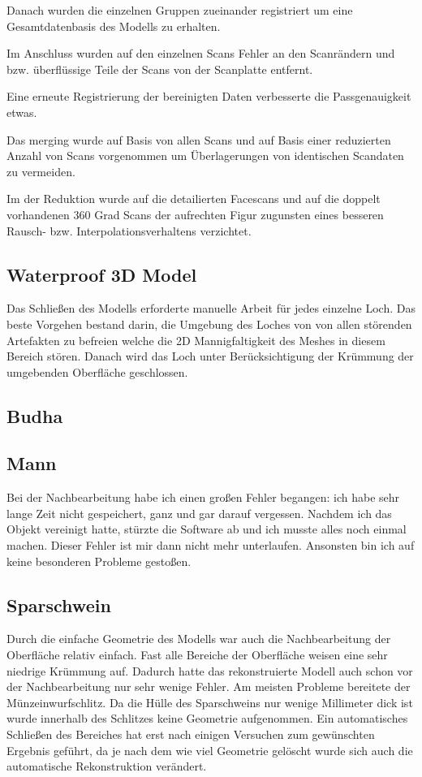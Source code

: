 \documentclass[]{article}
\begin{document}
Danach wurden die einzelnen Gruppen zueinander registriert um eine Gesamtdatenbasis des Modells zu erhalten.

Im Anschluss wurden auf den einzelnen Scans Fehler an den Scanrändern und bzw. überflüssige Teile der Scans von der Scanplatte entfernt.

Eine erneute Registrierung der bereinigten Daten verbesserte die Passgenauigkeit etwas. 

Das merging wurde auf Basis von allen Scans und auf Basis einer reduzierten Anzahl von Scans vorgenommen um Überlagerungen von identischen Scandaten zu vermeiden.

Im der Reduktion wurde auf die detailierten Facescans und auf die doppelt vorhandenen 360 Grad Scans der aufrechten Figur zugunsten eines besseren Rausch- bzw. Interpolationsverhaltens verzichtet.

\subsection{Waterproof 3D Model}

Das Schließen des Modells erforderte manuelle Arbeit für jedes einzelne Loch. Das beste Vorgehen bestand darin, die Umgebung des Loches von von allen störenden Artefakten zu befreien welche die 2D Mannigfaltigkeit des Meshes in diesem Bereich stören. Danach wird das Loch unter Berücksichtigung der Krümmung der umgebenden Oberfläche geschlossen.

\subsection{Budha}



\subsection{Mann}
Bei der Nachbearbeitung habe ich einen großen Fehler begangen: ich habe sehr lange Zeit nicht gespeichert, ganz und gar darauf vergessen. Nachdem ich das Objekt vereinigt hatte, stürzte die Software ab und ich musste alles noch einmal machen. Dieser Fehler ist mir dann nicht mehr unterlaufen. Ansonsten bin ich auf keine besonderen Probleme gestoßen.

\subsection{Sparschwein}
Durch die einfache Geometrie des Modells war auch die Nachbearbeitung der Oberfläche relativ einfach. Fast alle Bereiche der Oberfläche weisen eine sehr niedrige Krümmung auf. Dadurch hatte das rekonstruierte Modell auch schon vor der Nachbearbeitung nur sehr wenige Fehler. Am meisten Probleme bereitete der Münzeinwurfschlitz. Da die Hülle des Sparschweins nur wenige Millimeter dick ist wurde innerhalb des Schlitzes keine Geometrie aufgenommen. Ein automatisches Schließen des Bereiches hat erst nach einigen Versuchen zum gewünschten Ergebnis geführt, da je nach dem wie viel Geometrie gelöscht wurde sich auch die automatische Rekonstruktion verändert. 
\end{document}
